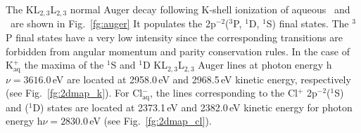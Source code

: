 

The KL$_{2,3}$L$_{2,3}$ normal Auger decay following K-shell ionization of aqueous \ki~and \cli~are shown in Fig.\ \ref{fg:auger} %
%
%
It populates the 2p$^{-2}$($^3$P, $^1$D, $^1$S) final states. The $^3$P final states have a very low intensity since the corresponding transitions are forbidden from angular momentum and parity conservation rules. %
In the case of K$^{+}_{\text{aq}}$ the maxima of the $^1$S and $^1$D KL$_{2,3}$L$_{2,3}$ Auger lines at photon energy h$\nu = 3616.0$\,eV are located at 2958.0\,eV and 2968.5\,eV kinetic energy, respectively (see Fig.\ \ref{fg:2dmap_k}). For Cl$^{-}_{\text{aq}}$, the lines corresponding to the Cl$^{+}$ 2p$^{-2}$($^1$S) and ($^1$D) states are located at 2373.1\,eV and 2382.0\,eV kinetic energy for photon energy h$\nu = 2830.0$\,eV (see Fig.\ \ref{fg:2dmap_cl}).


